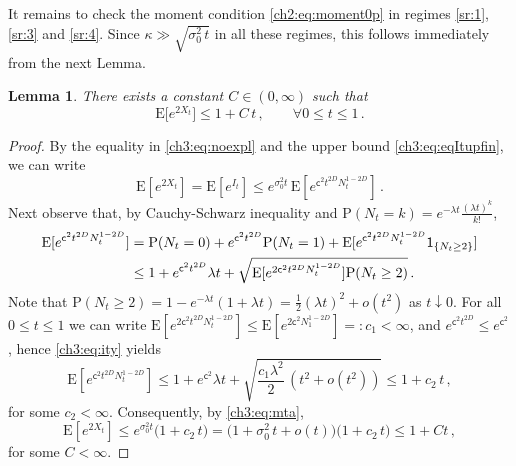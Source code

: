 \documentclass[a4paper,reqno,11pt]{amsart}
\numberwithin{equation}{section}
\newtheorem{lemma}[theorem]{Lemma}
\newcommand{\PEfont}{\mathrm}
\renewcommand{\P}{\ensuremath{\PEfont P}}
\newcommand{\E}{\ensuremath{\PEfont E}}
\newcommand{\ind}{{\sf 1}}
\newcommand\sfc{\mathsf{c}}
\begin{document}
\smallskip

It remains to check the moment condition \eqref{ch2:eq:moment0p}
in regimes \eqref{sr:1}, \eqref{sr:3} and \eqref{sr:4}. Since $\kappa \gg 
\sqrt{ \sigma_0^2 \, t}$
in all these regimes, this follows immediately from the next Lemma.

\begin{lemma}\label{ch3:lemma:moments}
There exists a constant $C \in (0,\infty)$
such that
 \[
  \E\big[e^{2X_t}\big]\leq 1 + C \, t \,, \qquad
  \forall 0 \le t \le 1 \,.
 \]
\end{lemma}

\begin{proof}
By the equality in \eqref{ch3:eq:noexpl} and the upper bound \eqref{ch3:eq:eqItupfin}, 
we can write
\begin{equation}\label{ch3:eq:mta}
	\E[e^{2X_t}] = \E[e^{I_t}] \le e^{\sigma_0^2 t} \, \E[e^{\sfc^2 t^{2D} N_t^{1-2D}}] \,.
\end{equation}
Next observe that, by Cauchy-Schwarz 
inequality and $\P(N_t = k) = e^{-\lambda t} \frac{(\lambda t)^k}{k!}$,
\begin{equation} \label{ch3:eq:ity}
\begin{split}
	\E[e^{\sfc^2 t^{2D} N_t^{1-2D}}] & = \P(N_t = 0)
	+ e^{\sfc^2 t^{2D}} \P(N_t=1) + \E[e^{\sfc^2 t^{2D} N_t^{1-2D}}
	\ind_{\{N_t \ge 2\}}] \\
	& \le 1 + e^{\sfc^2 t^{2D}} \lambda t  +
	\sqrt{\E[e^{2\sfc^2 t^{2D} N_t^{1-2D}}] \P(N_t\ge 2)} \,.
\end{split}
\end{equation}
Note that 
$\P(N_t\ge 2) = 1 - e^{-\lambda t} (1+\lambda t) = \frac{1}{2} (\lambda t)^2
+ o(t^2)$ as $t\downarrow 0$.
For all $0 \le t \le 1$ we can write
$\E[e^{2\sfc^2 t^{2D} N_t^{1-2D}}] \le \E[e^{2\sfc^2 N_1^{1-2D}}] =: c_1 < \infty$,
and $e^{\sfc^2 t^{2D}} \le e^{\sfc^2}$, hence \eqref{ch3:eq:ity} yields
\begin{equation*}
	\E[e^{\sfc^2 t^{2D} N_t^{1-2D}}] \le 1 + e^{\sfc^2} \lambda t
	+ \sqrt{\frac{c_1 \lambda^2}{2} \, (t^2+o(t^2))} \le 1 + c_2 \, t \,,
\end{equation*}
for some $c_2 < \infty$. Consequently, by \eqref{ch3:eq:mta},
\begin{equation*}
	\E[e^{2 X_t}] \le e^{\sigma_0^2 t} \big(1+c_2 \, t \big)
	= \big(1+ \sigma_0^2 \, t + o(t) \big)\big(1+c_2 \, t \big)
	\le 1 + C t \,,
\end{equation*}
for some $C < \infty$.
\end{proof}
\end{document}
